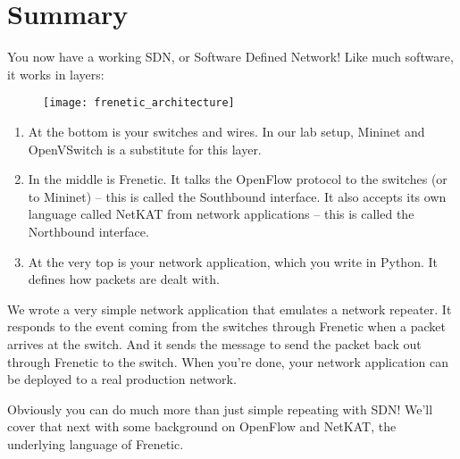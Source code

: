 \section{Summary}

You now have a working SDN, or Software Defined Network!   Like much software, it works in layers:

\begin{figure}[h]
\centering
\texttt{[image: frenetic\_architecture]}
\end{figure}

\begin{enumerate}
\item At the bottom is your switches and wires.  In our lab setup, Mininet and OpenVSwitch is a substitute for this layer.
\item In the middle is Frenetic.  It talks the OpenFlow protocol to the switches (or to Mininet) -- this is called the Southbound interface.  It also accepts its own language called NetKAT from network applications -- this is called the Northbound interface.
\item At the very top is your network application, which you write in Python.  It defines how packets are dealt with.
\end{enumerate}

We wrote a very simple network application that emulates a network repeater.   
It responds to the  event coming from the switches through Frenetic when a packet 
arrives at the switch.  
And it sends the  message to send the packet back out through Frenetic to the switch.  
When you're done, your network application can be deployed to a real production network.

Obviously you can do much more than just simple repeating with SDN!  
We'll cover that next with some background on OpenFlow and NetKAT, the underlying language of Frenetic. 